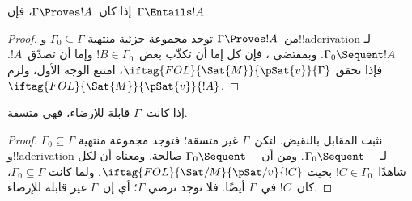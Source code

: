 \documentclass[../../../include/open-logic-section]{subfiles}
\begin{document}
\begin{cor}
إذا كان~$\Gamma \Proves !A$، فإن~$\Gamma \Entails !A$.
\end{cor}

\begin{proof}
من~$\Gamma \Proves !A$ توجد مجموعة جزئية منتهية
$\Gamma_0 \subseteq \Gamma$ و!!a{derivation} لـ
$\Gamma_0 \Sequent !A$. وبمقتضى ، فإن كل
إما أن تكذّب بعض~$!B \in \Gamma_0$ وإما أن تصدّق~$!A$.
فإذا تحقق
$\iftag{FOL}{\Sat{M}}{\pSat{v}}{\Gamma}$، امتنع الوجه الأول، ولزم
$\iftag{FOL}{\Sat{M}}{\pSat{v}}{!A}$.
\end{proof}

\begin{cor}
إذا كانت~$\Gamma$ قابلة للإرضاء، فهي متسقة.
\end{cor}

\begin{proof}
نثبت المقابل بالنقيض. لتكن~$\Gamma$ غير متسقة؛ فتوجد مجموعة منتهية
$\Gamma_0 \subseteq \Gamma$ و!!a{derivation} لـ
$\Gamma_0 \Sequent \quad$. ومن  أن
$\Gamma_0 \Sequent \quad$ صالحة.
ومعناه أن لكل
شاهدًا~$!C \in \Gamma_0$ بحيث
$\iftag{FOL}{\Sat/{M}}{\pSat/{v}}{!C}$.
ولما كانت $\Gamma_0 \subseteq \Gamma$، كان~$!C$ في~$\Gamma$ أيضًا.
فلا توجد  ترضي
$\Gamma$؛ أي إن~$\Gamma$ غير قابلة للإرضاء.
\end{proof}
\end{document}
